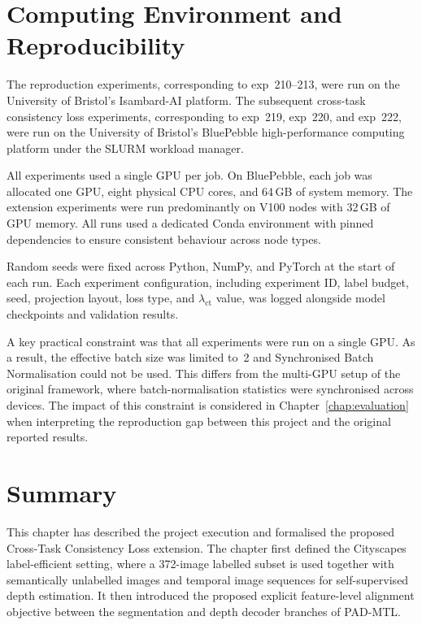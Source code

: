 \section{Computing Environment and Reproducibility}
\label{sec:computing-environment}

The reproduction experiments, corresponding to exp~210--213, were run on
the University of Bristol's Isambard-AI platform. The subsequent
cross-task consistency loss experiments, corresponding to exp~219,
exp~220, and exp~222, were run on the University of Bristol's BluePebble
high-performance computing platform under the SLURM workload manager.

All experiments used a single GPU per job. On BluePebble, each job was
allocated one GPU, eight physical CPU cores, and 64\,GB of system memory.
The extension experiments were run predominantly on V100 nodes with
32\,GB of GPU memory. All runs used a dedicated Conda environment with
pinned dependencies to ensure consistent behaviour across node types.

Random seeds were fixed across Python, NumPy, and PyTorch at the start of
each run. Each experiment configuration, including experiment ID, label
budget, seed, projection layout, loss type, and $\lambda_\text{ct}$
value, was logged alongside model checkpoints and validation results.

A key practical constraint was that all experiments were run on a single
GPU. As a result, the effective batch size was limited to~2 and
Synchronised Batch Normalisation could not be used. This differs from the
multi-GPU setup of the original framework, where batch-normalisation
statistics were synchronised across devices. The impact of this constraint
is considered in Chapter~\ref{chap:evaluation} when interpreting the
reproduction gap between this project and the original reported results.

\section{Summary}
\label{sec:exec-summary}

This chapter has described the project execution and formalised the
proposed Cross-Task Consistency Loss extension. The chapter first defined
the Cityscapes label-efficient setting, where a 372-image labelled subset
is used together with semantically unlabelled images and temporal image
sequences for self-supervised depth estimation. It then introduced the
proposed explicit feature-level alignment objective between the
segmentation and depth decoder branches of PAD-MTL.


